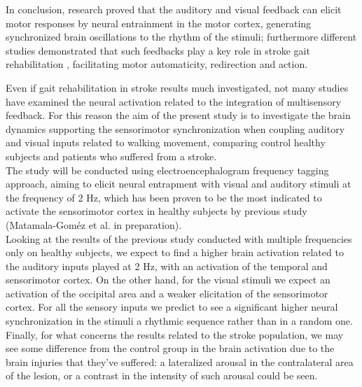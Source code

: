 In conclusion, research proved that the auditory and visual feedback can elicit motor responses by neural entrainment in the motor cortex, generating synchronized brain oscillations to the rhythm of the stimuli; furthermore different studies demonstrated that such feedbacks play a key role in stroke gait rehabilitation \parencite{Chen_2018}, facilitating motor automaticity, redirection and action.

Even if gait rehabilitation in stroke results much investigated, not many studies have examined the neural activation related to the integration of multisensory feedback. For this reason the aim of the present study is to investigate the brain dynamics supporting the sensorimotor synchronization when coupling auditory and visual inputs related to walking movement, comparing control healthy subjects and patients who suffered from a stroke. \\
The study will be conducted using electroencephalogram frequency tagging approach, aiming to elicit neural entrapment with visual and auditory stimuli at the frequency of 2 Hz, which has been proven to be the most indicated to activate the sensorimotor cortex in healthy subjects by previous study (Matamala-Goméz et al. in preparation).\\
Looking at the results of the previous study conducted with multiple frequencies only on healthy subjects, we expect to find a higher brain activation related to the auditory inputs played at 2 Hz, with an activation of the temporal and sensorimotor cortex. On the other hand, for the visual stimuli we expect an activation of the occipital area and a weaker elicitation of the sensorimotor cortex. For all the sensory inputs we predict to see a significant higher neural synchronization in the stimuli a rhythmic sequence rather than in a random one. \\
Finally, for what concerns the results related to the stroke population, we may see some difference from the control group in the brain activation due to the brain injuries that they've suffered: a lateralized arousal  in the contralateral area of the lesion, or a contrast in the intensity of such arousal could be seen.

